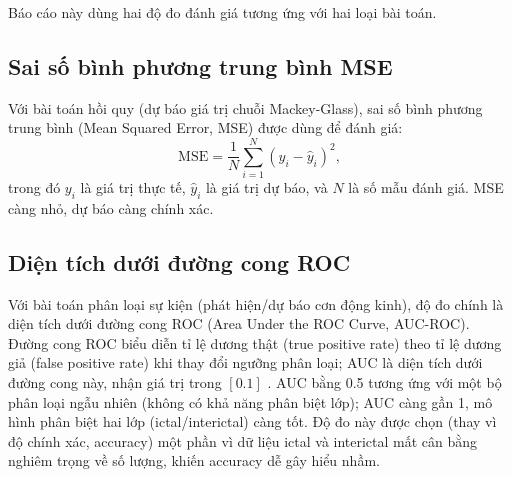 Báo cáo này dùng hai độ đo đánh giá tương ứng với hai loại bài toán.

\subsection{Sai số bình phương trung bình MSE}

Với bài toán hồi quy (dự báo giá trị chuỗi Mackey-Glass), sai số bình phương trung bình
(Mean Squared Error, MSE) được dùng để đánh giá:
\begin{equation}
	\text{MSE} = \frac{1}{N} \sum_{i=1}^{N} \left(y_i - \hat{y}_i\right)^2,
	\label{eq:mse}
\end{equation}
trong đó $y_i$ là giá trị thực tế, $\hat{y}_i$ là giá trị dự báo, và $N$ là số mẫu đánh giá.
MSE càng nhỏ, dự báo càng chính xác.

\subsection{Diện tích dưới đường cong ROC}

Với bài toán phân loại sự kiện (phát hiện/dự báo cơn động kinh), độ đo chính là diện tích dưới
đường cong ROC (Area Under the ROC Curve, AUC-ROC). Đường cong ROC biểu diễn tỉ lệ dương thật
(true positive rate) theo tỉ lệ dương giả (false positive rate) khi thay đổi ngưỡng phân loại;
AUC là diện tích dưới đường cong này, nhận giá trị trong $[0.1]$ \cite{fawcett2006roc}. AUC
bằng 0.5 tương ứng với một bộ phân loại ngẫu nhiên (không có khả năng phân biệt lớp); AUC càng
gần 1, mô hình phân biệt hai lớp (ictal/interictal) càng tốt. Độ đo này được chọn (thay vì độ
chính xác, accuracy) một phần vì dữ liệu ictal và interictal mất cân bằng nghiêm trọng về số
lượng, khiến accuracy dễ gây hiểu nhầm.
